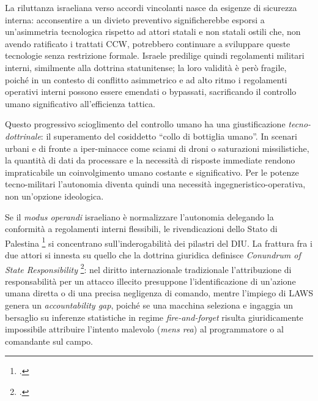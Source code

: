 \documentclass[a4paper,12pt]{report}
\begin{document}
La riluttanza israeliana verso accordi vincolanti nasce da esigenze di sicurezza
interna: acconsentire a un divieto preventivo significherebbe esporsi a
un'asimmetria tecnologica rispetto ad attori statali e non statali ostili che,
non avendo ratificato i trattati CCW, potrebbero continuare a sviluppare queste
tecnologie senza restrizione formale. Israele predilige quindi regolamenti
militari interni, similmente alla dottrina statunitense; la loro validità è però
fragile, poiché in un contesto di conflitto asimmetrico e ad alto ritmo i
regolamenti operativi interni possono essere emendati o bypassati, sacrificando
il controllo umano significativo all'efficienza tattica.
 
Questo progressivo scioglimento del controllo umano ha una giustificazione
\textit{tecno-dottrinale}: il superamento del cosiddetto ``collo di bottiglia
umano''. In scenari urbani e di fronte a iper-minacce come sciami di droni o
saturazioni missilistiche, la quantità di dati da processare e la necessità di
risposte immediate rendono impraticabile un coinvolgimento umano costante e
significativo. Per le potenze tecno-militari l'autonomia diventa quindi una
necessità ingegneristico-operativa, non un'opzione ideologica.
 
Se il \textit{modus operandi} israeliano è normalizzare l'autonomia delegando la
conformità a regolamenti interni flessibili, le rivendicazioni dello Stato di
Palestina \footcite{palestine_2023} si concentrano sull'inderogabilità dei
pilastri del DIU. La frattura fra i due attori si innesta su quello che la
dottrina giuridica definisce \textit{Conundrum of State Responsibility}
\footcite{state_resp_2025}: nel diritto internazionale tradizionale
l'attribuzione di responsabilità per un attacco illecito presuppone
l'identificazione di un'azione umana diretta o di una precisa negligenza di
comando, mentre l'impiego di LAWS genera un \textit{accountability gap}, poiché
se una macchina seleziona e ingaggia un bersaglio su inferenze statistiche in
regime \textit{fire-and-forget} risulta giuridicamente impossibile attribuire
l'intento malevolo (\textit{mens rea}) al programmatore o al comandante sul
campo.
 
\end{document}

